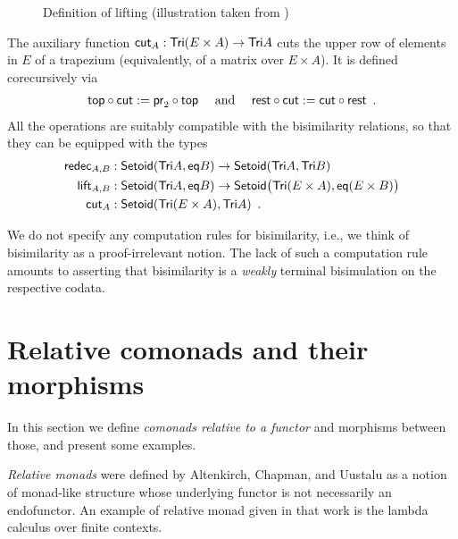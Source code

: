 \documentclass[a4paper,USenglish]{lipics}
\newcommand{\parencite}[1]{\cite{#1}}
\begin{document}
\begin{ex}
\begin{figure}[bt]
  \caption{Definition of lifting (illustration taken from \parencite{DBLP:conf/types/MatthesP11})}
  \label{fig:lift}
\end{figure}
% 
  The auxiliary function $\mathsf{cut}_A : \mathsf{Tri}(E\times A) \to \mathsf{Tri} A$ cuts the upper row of elements in $E$ of a trapezium (equivalently, of a matrix over $E\times A$).
  It is defined corecursively via
% 
  \begin{align*} {\ensuremath{\mathsf{top}}} \circ {\ensuremath{\mathsf{cut}}} := {\mathsf{pr}_2} \circ {\ensuremath{\mathsf{top}}} \quad\text{ and } \quad
                     {\ensuremath{\mathsf{rest}}} \circ {\ensuremath{\mathsf{cut}}} := {\mathsf{cut}} \circ {\ensuremath{\mathsf{rest}}} \enspace . 
      \end{align*}
%       
All the operations are suitably compatible with the bisimilarity relations, so that they can be equipped with the types
  \begin{align*}
    \mathsf{redec}_{A,B} &: \mathsf{Setoid}(\mathsf{Tri} A,\mathsf{eq} B) \to \mathsf{Setoid}(\mathsf{Tri} A,\mathsf{Tri} B ) \\
    \mathsf{lift}_{A,B} &: \mathsf{Setoid}(\mathsf{Tri} A,\mathsf{eq} B) \to \mathsf{Setoid}\bigr(\mathsf{Tri} (E \times A),\mathsf{eq}(E\times B)\bigr) \\
    \mathsf{cut}_A &:  \mathsf{Setoid}(\mathsf{Tri}(E\times A) , \mathsf{Tri} A) \enspace .
  \end{align*}
\end{ex}


\begin{rem}
 We do not specify any computation rules for bisimilarity, i.e., we think of bisimilarity as a proof-irrelevant notion. 
 The lack of such a computation rule amounts to asserting that bisimilarity is a \emph{weakly} terminal bisimulation on the respective codata. 
\end{rem}


  
\section{Relative comonads and their morphisms}\label{sec:comonads}

In this section we define \emph{comonads relative to a functor} and morphisms between those, and present some examples.

\emph{Relative monads} were defined by Altenkirch, Chapman, and Uustalu \cite{DBLP:conf/fossacs/AltenkirchCU10} as a notion of monad-like structure
whose underlying functor is not necessarily an endofunctor. 
An example of relative monad given in that work is the lambda calculus over finite contexts.
\end{document}
